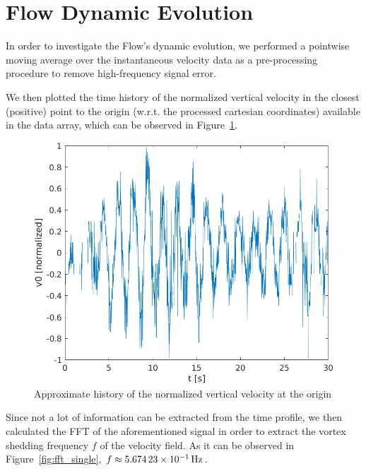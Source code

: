 \documentclass[12pt]{article}
\begin{document}
\section{Flow Dynamic Evolution} \label{sec:dynamics}

        In order to investigate the Flow's dynamic evolution, we performed a pointwise moving average over the instantaneous velocity data as a pre-processing procedure to remove high-frequency signal error.

        We then plotted the time history of the normalized vertical velocity in the closest (positive) point to the origin (w.r.t. the processed cartesian coordinates) available in the data array, which can be observed in Figure~\ref{fig:origin_history}.

        \begin{figure}[ht!]
                \centering
                \includegraphics[width=\textwidth]{history.png}
                \caption{Approximate history of the normalized vertical velocity at the origin}
                \label{fig:origin_history}
        \end{figure}

        Since not a lot of information can be extracted from the time profile, we then calculated the FFT of the aforementioned signal in order to extract the vortex shedding frequency $ f $ of the velocity field. As it can be observed in Figure~\ref{fig:fft_single}, $ f \approx \SI{5.67423E-1}{\hertz} $.
\end{document}

